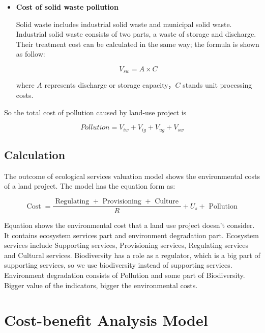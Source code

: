 \documentclass{mcmthesis}
\begin{document}
\begin{itemize}
					
					\item \textbf{Cost of solid waste pollution}
					
					Solid waste includes industrial solid waste and municipal solid waste. Industrial solid waste consists of two parts, a waste of storage and discharge. Their treatment cost can be calculated in the same way; the formula is shown as follow:
					
					\begin{equation}
						V _ { sw } = A \times C
					\end{equation}
				
					where $A$ represents discharge or storage capacity，$C$ stands unit processing costs.

				\end{itemize}
			
				So the total cost of pollution caused by land-use project is 
				
				\begin{equation}
				Pollution = V _ { i w } + V _ { i g } + V _ { u g } + V _ { sw }
				\end{equation}
				
		
		\subsection{Calculation}
			
			The outcome of ecological services valuation model shows the environmental costs of a land project. The model has the equation form as:
			
			\begin{equation}
			\operatorname { Cost } = \frac { \text { Regulating } + \text { Provisioning } + \text { Culture } } { R } + U _ { s } + \text { Pollution }
			\end{equation}
			
			Equation shows the environmental cost that a land use project doesn’t consider. It contains ecosystem services part and environment degradation part. Ecosystem services include Supporting services, Provisioning services, Regulating services and Cultural services. Biodiversity has a role as a regulator, which is a big part of supporting services, so we use biodiversity instead of supporting services. Environment degradation consists of Pollution and some part of Biodiversity. Bigger value of the indicators, bigger the environmental costs.
			
			
			
	\section{Cost-benefit Analysis Model}
	
\end{document}
